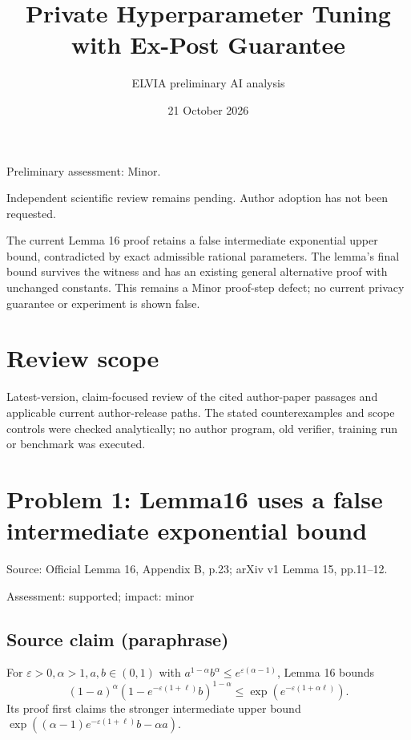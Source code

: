 \documentclass[11pt]{article}
\begin{document}
\title{Private Hyperparameter Tuning with Ex-Post Guarantee}

\author{ELVIA preliminary AI analysis}\date{21 October 2026}\maketitle

Preliminary assessment: Minor.\par

Independent scientific review remains pending. Author adoption has not been requested.

The current Lemma 16 proof retains a false intermediate exponential upper bound, contradicted by exact admissible rational parameters. The lemma’s final bound survives the witness and has an existing general alternative proof with unchanged constants. This remains a Minor proof-step defect; no current privacy guarantee or experiment is shown false.

\section*{Review scope}

Latest-version, claim-focused review of the cited author-paper passages and applicable current author-release paths. The stated counterexamples and scope controls were checked analytically; no author program, old verifier, training run or benchmark was executed.

\section*{Problem 1: Lemma16 uses a false intermediate exponential bound}

Source: Official Lemma 16, Appendix B, p.23; arXiv v1 Lemma 15, pp.11–12.

Assessment: supported; impact: minor

\subsection*{Source claim (paraphrase)}

For \(\varepsilon>0,\alpha>1,a,b\in(0,1)\) with \(a^{1-\alpha}b^\alpha\le e^{\varepsilon(\alpha-1)}\), Lemma 16 bounds \[(1-a)^\alpha(1-e^{-\varepsilon(1+\ell)}b)^{1-\alpha}\le\exp(e^{-\varepsilon(1+\alpha\ell)}).\] Its proof first claims the stronger intermediate upper bound \(\exp((\alpha-1)e^{-\varepsilon(1+\ell)}b-\alpha a)\).
\end{document}
